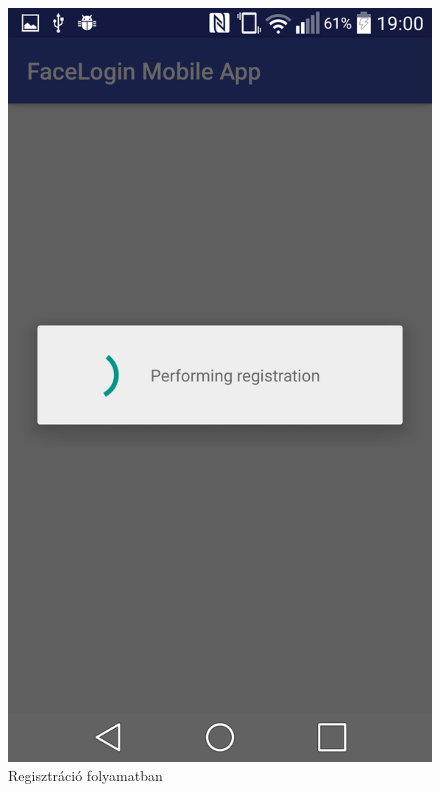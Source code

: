 \begin{figure}[h]
\begin{minipage}{.30\textwidth}
     \includegraphics[scale=0.10]{img/performing_registration}
     \caption{Regisztráció folyamatban}
 \end{minipage}
 \begin{minipage}{.30\textwidth} 
\centering

\end{minipage}
\end{figure}
